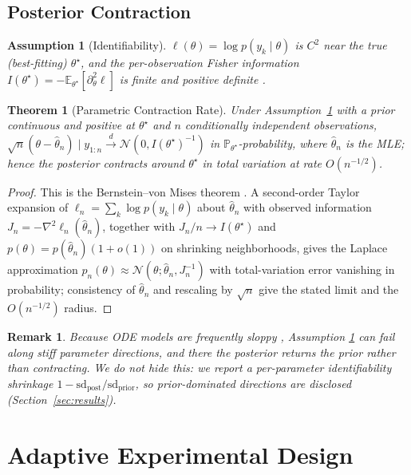 \documentclass[journal]{IEEEtran}
\newtheorem{theorem}{Theorem}
\newtheorem{assumption}{Assumption}
\newtheorem{remark}{Remark}
\newcommand{\E}{\mathbb{E}}
\newcommand{\Prob}{\mathbb{P}}
\begin{document}
\subsection{Posterior Contraction}

\begin{assumption}[Identifiability]
\label{ass:ident}
$\ell(\theta)=\log p(y_k\mid\theta)$ is $C^2$ near the true (best-fitting)
$\theta^\star$, and the per-observation Fisher information
$I(\theta^\star)=-\E_{\theta^\star}[\partial^2_\theta\ell]$ is finite and positive
definite \cite{rao1945}.
\end{assumption}

\begin{theorem}[Parametric Contraction Rate]
\label{thm:contraction}
Under Assumption~\ref{ass:ident} with a prior continuous and positive at
$\theta^\star$ and $n$ conditionally independent observations,
$\sqrt n(\theta-\hat\theta_n)\mid y_{1:n}\xrightarrow{d}\mathcal{N}(0,I(\theta^\star)^{-1})$
in $\Prob_{\theta^\star}$-probability, where $\hat\theta_n$ is the MLE; hence the
posterior contracts around $\theta^\star$ in total variation at rate $O(n^{-1/2})$.
\end{theorem}
\begin{proof}
This is the Bernstein--von Mises theorem \cite{vandervaart1998}. A second-order
Taylor expansion of $\ell_n=\sum_k\log p(y_k\mid\theta)$ about $\hat\theta_n$ with
observed information $J_n=-\nabla^2\ell_n(\hat\theta_n)$, together with
$J_n/n\to I(\theta^\star)$ and $p(\theta)=p(\hat\theta_n)(1+o(1))$ on shrinking
neighborhoods, gives the Laplace approximation
$p_n(\theta)\approx\mathcal{N}(\theta;\hat\theta_n,J_n^{-1})$ with total-variation
error vanishing in probability; consistency of $\hat\theta_n$ and rescaling by
$\sqrt n$ give the stated limit and the $O(n^{-1/2})$ radius.
\end{proof}

\begin{remark}
Because ODE models are frequently sloppy \cite{gutenkunst2007}, Assumption
\ref{ass:ident} can fail along stiff parameter directions, and there the
posterior returns the prior rather than contracting. We do not hide this: we
report a per-parameter \emph{identifiability shrinkage}
$1-\mathrm{sd}_{\text{post}}/\mathrm{sd}_{\text{prior}}$, so prior-dominated
directions are disclosed (Section~\ref{sec:results}).
\end{remark}

\section{Adaptive Experimental Design}
\label{sec:design}
\end{document}
